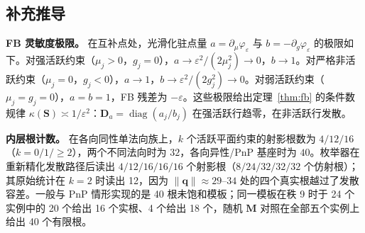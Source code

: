\subsection{补充推导}\label{app:deriv}
\textbf{FB 灵敏度极限。} 在互补点处，光滑化驻点量 $a=\partial_\mu\varphi_\varepsilon$ 与 $b=-\partial_g\varphi_\varepsilon$ 的极限如下。对强活跃约束（$\mu_j>0$，$g_j=0$），$a\to\varepsilon^2/(2\mu_j^2)\to0$，$b\to1$。对严格非活跃约束（$\mu_j=0$，$g_j<0$），$a\to1$，$b\to\varepsilon^2/(2g_j^2)\to0$。对弱活跃约束（$\mu_j=g_j=0$），$a=b=1$，FB 残差为 $-\varepsilon$。这些极限给出定理~\ref{thm:fb} 的条件数规律 $\kappa(\mathbf S)\asymp1/\varepsilon^2$：$\mathbf D_a=\operatorname{diag}(a_j/b_j)$ 在强活跃行趋零，在非活跃行发散。

\textbf{内层根计数。} 在各向同性单法向族上，$k$ 个活跃平面约束的射影根数为 $4/12/16$（$k=0/1/\ge2$），两个不同法向时为 $32$，各向异性/PnP 基座时为 $40$。枚举器在重新精化发散路径后读出 $4/12/16/16/16$ 个射影根（$8/24/32/32/32$ 个仿射根）；其原始统计在 $k=2$ 时读出 12，因为 $\|\mathbf q\|\approx29$--$34$ 处的四个真实根越过了发散容差。一般与 PnP 情形实现的是 40 根未饱和模板；同一模板在秩 9 时于 24 个实例中的 20 个给出 16 个实根、4 个给出 18 个，随机 $\mathbf M$ 对照在全部五个实例上给出 40 个有限根。
